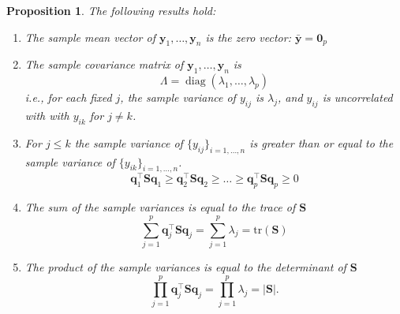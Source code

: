 \documentclass[]{book}
\newtheorem{proposition}{Proposition}[chapter]
\theoremstyle{definition}
\theoremstyle{definition}
\theoremstyle{definition}
\theoremstyle{remark}
\begin{document}
\begin{proposition}
\protect\hypertarget{prp:pca2}{}{\label{prp:pca2} }The following results hold:

\begin{enumerate}
\def\labelenumi{\arabic{enumi}.}
\item
  The sample mean vector of \(\boldsymbol y_1, \ldots , \boldsymbol y_n\) is the zero vector: \(\bar{\boldsymbol y}={\mathbf 0}_p\)
\item
  The sample covariance matrix of \(\boldsymbol y_1, \ldots, \boldsymbol y_n\) is
  \[\Lambda = \operatorname{diag}(\lambda_1, \ldots, \lambda_p)\]
  i.e., for each fixed \(j\), the sample variance of \(y_{ij}\) is \(\lambda_j\), and \(y_{ij}\) is uncorrelated with with \(y_{ik}\) for \(j\not = k\).
\item
  For \(j\leq k\) the sample variance of \(\{y_{ij}\}_{i=1, \ldots , n}\) is greater than or equal to the sample variance of \(\{y_{ik}\}_{i=1, \ldots , n}\).
  \[\boldsymbol q_1^\top \boldsymbol S\boldsymbol q_1 \geq \boldsymbol q_2^\top \boldsymbol S\boldsymbol q_2 \geq \ldots \geq \boldsymbol q_p^\top \boldsymbol S\boldsymbol q_p\geq 0\]
\item
  The sum of the sample variances is equal to the trace of \(\boldsymbol S\)
  \[\sum_{j=1}^p \boldsymbol q_j^\top \boldsymbol S\boldsymbol q_j = \sum_{j=1}^p \lambda_j = \text{tr}(\boldsymbol S)\]
\item
  The product of the sample variances is equal to the determinant of \(\boldsymbol S\)
  \[\prod_{j=1}^p \boldsymbol q_j^\top \boldsymbol S\boldsymbol q_j = \prod_{j=1}^p \lambda_j = |\boldsymbol S|.\]
\end{enumerate}
\end{proposition}
\end{document}
